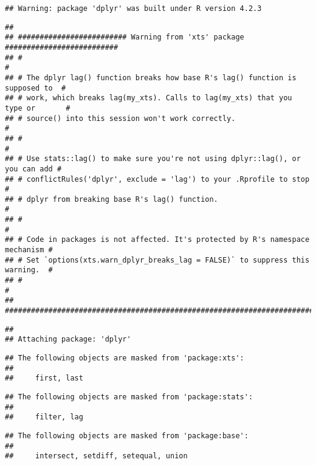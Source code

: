 \documentclass[
]{book}
\begin{document}
\begin{verbatim}
## Warning: package 'dplyr' was built under R version 4.2.3
\end{verbatim}

\begin{verbatim}
## 
## ######################### Warning from 'xts' package ##########################
## #                                                                             #
## # The dplyr lag() function breaks how base R's lag() function is supposed to  #
## # work, which breaks lag(my_xts). Calls to lag(my_xts) that you type or       #
## # source() into this session won't work correctly.                            #
## #                                                                             #
## # Use stats::lag() to make sure you're not using dplyr::lag(), or you can add #
## # conflictRules('dplyr', exclude = 'lag') to your .Rprofile to stop           #
## # dplyr from breaking base R's lag() function.                                #
## #                                                                             #
## # Code in packages is not affected. It's protected by R's namespace mechanism #
## # Set `options(xts.warn_dplyr_breaks_lag = FALSE)` to suppress this warning.  #
## #                                                                             #
## ###############################################################################
\end{verbatim}

\begin{verbatim}
## 
## Attaching package: 'dplyr'
\end{verbatim}

\begin{verbatim}
## The following objects are masked from 'package:xts':
## 
##     first, last
\end{verbatim}

\begin{verbatim}
## The following objects are masked from 'package:stats':
## 
##     filter, lag
\end{verbatim}

\begin{verbatim}
## The following objects are masked from 'package:base':
## 
##     intersect, setdiff, setequal, union
\end{verbatim}
\end{document}
